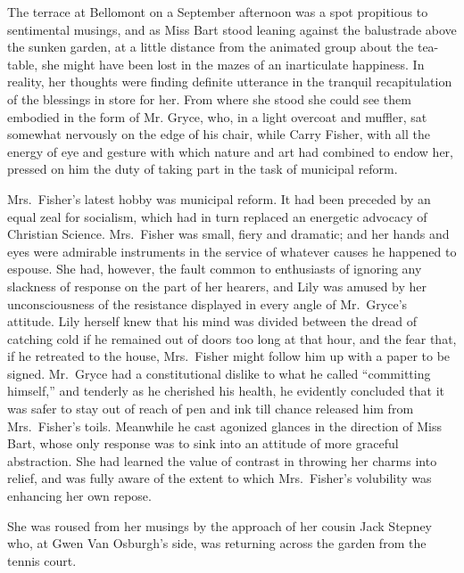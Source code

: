\documentclass[12pt,a4paper]{book}
\begin{document}
The terrace at Bellomont on a September afternoon was a spot
propitious to sentimental musings, and as Miss Bart stood leaning
against the balustrade above the sunken garden, at a little
distance from the animated group about the tea-table, she might
have been lost in the mazes of an inarticulate happiness. In
reality, her thoughts were finding definite utterance in the
tranquil recapitulation of the blessings in store for her. From
where she stood she could see them embodied in the form of Mr.
Gryce, who, in a light overcoat and muffler, sat somewhat
nervously on the edge of his chair, while Carry Fisher, with all
the energy of eye and gesture with which nature and art had
combined to endow her, pressed on him the duty of taking part in
the task of municipal reform.





Mrs.\ Fisher's latest hobby was municipal reform. It had been
preceded by an equal zeal for socialism, which had in turn
replaced an energetic advocacy of Christian Science. Mrs.\ Fisher
was small, fiery and dramatic; and her hands and eyes were
admirable instruments in the service of whatever causes he
happened to espouse. She had, however, the fault common to
enthusiasts of ignoring any slackness of response on the part of
her hearers, and Lily was amused by her unconsciousness of the
resistance displayed in every angle of Mr.\ Gryce's attitude. Lily
herself knew that his mind was divided between the dread of
catching cold if he remained out of doors too long at that hour,
and the fear that, if he retreated to the house, Mrs.\ Fisher
might follow him up with a paper to be signed. Mr.\ Gryce had a
constitutional dislike to what he called ``committing himself,''
and tenderly as he cherished his health, he evidently concluded
that it was safer to stay out of reach of pen and ink till chance
released him from Mrs.\ Fisher's toils. Meanwhile he cast agonized
glances in the direction of Miss Bart, whose only response was to
sink into an attitude of more graceful abstraction. She had
learned the value of contrast in throwing her charms into relief,
and was fully aware of the extent to which Mrs.\ Fisher's
volubility was enhancing her own repose.





She was roused from her musings by the approach of her cousin
Jack Stepney who, at Gwen Van Osburgh's side, was returning
across the garden from the tennis court.
\end{document}
